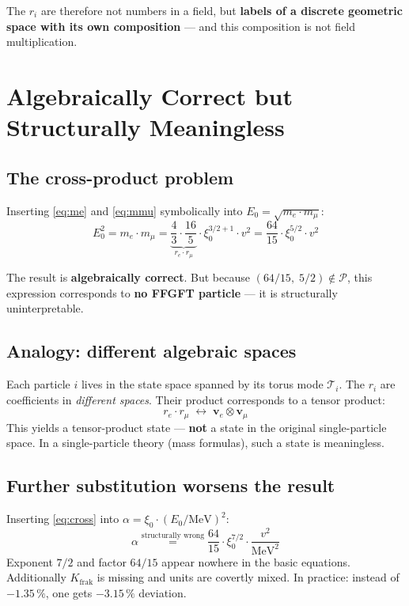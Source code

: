 The $r_i$ are therefore not numbers in a field, but
\textbf{labels of a discrete geometric space with its own composition} ---
and this composition is not field multiplication.

\section{Algebraically Correct but Structurally Meaningless}

\subsection{The cross-product problem}

Inserting \eqref{eq:me} and \eqref{eq:mmu} symbolically into
$E_0 = \sqrt{m_e \cdot m_\mu}$:
\begin{equation}
  E_0^2 = m_e \cdot m_\mu
        = \underbrace{\frac{4}{3} \cdot \frac{16}{5}}_{r_e \cdot r_\mu}
          \cdot \xi_0^{3/2+1} \cdot v^2
        = \frac{64}{15} \cdot \xi_0^{5/2} \cdot v^2
  \label{eq:cross}
\end{equation}

The result is \textbf{algebraically correct}. But because
$(64/15,\;5/2) \notin \mathcal{P}$, this expression corresponds to
\textbf{no FFGFT particle} --- it is structurally uninterpretable.

\subsection{Analogy: different algebraic spaces}

Each particle $i$ lives in the state space spanned by its torus mode $\mathcal{T}_i$.
The $r_i$ are coefficients in \emph{different spaces}.
Their product corresponds to a tensor product:
\[
  r_e \cdot r_\mu \;\leftrightarrow\; \mathbf{v}_e \otimes \mathbf{v}_\mu
\]
This yields a tensor-product state --- \textbf{not} a state in the original
single-particle space. In a single-particle theory (mass formulas), such
a state is meaningless.

\subsection{Further substitution worsens the result}

Inserting \eqref{eq:cross} into $\alpha = \xi_0 \cdot (E_0/\text{MeV})^2$:
\begin{equation}
  \alpha \stackrel{\text{structurally wrong}}{=}
  \frac{64}{15} \cdot \xi_0^{7/2} \cdot \frac{v^2}{\text{MeV}^2}
\end{equation}
Exponent $7/2$ and factor $64/15$ appear nowhere in the basic equations.
Additionally $K_{\text{frak}}$ is missing and units are covertly mixed.
In practice: instead of $-1.35\,\%$, one gets $-3.15\,\%$ deviation.

